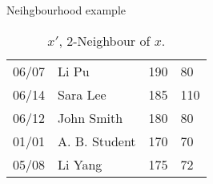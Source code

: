 \begin{frame}
\begin{exampleblock}{Neihgbourhood example}
{\begin{table}[H]
\begin{tabular}{l|l|l|l}
          \hline
          06/07 & Li Pu & 190 & 80 \\
          06/14 & Sara Lee & 185 & 110  \\
          06/12 & John Smith & \alert{180} & \alert{80} \\
          01/01 & A. B. Student & 170 & 70 \\
          05/08 & Li Yang & 175 & 72 
        \end{tabular}
        \caption{$x'$, 2-Neighbour of $x$.}
        \label{tab:data-x-edit}
      \end{table}
    }
  \end{exampleblock}

\end{frame}


